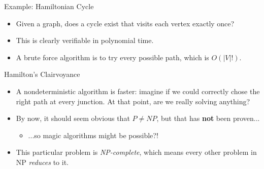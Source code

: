 \documentclass[aspectratio=169, handout]{beamer}
\begin{document}
\begin{frame}{Example: Hamiltonian Cycle}
    \begin{itemize}
        \item Given a graph, does a cycle exist that visits each vertex exactly once?
    \end{itemize}
    \begin{center}
    \end{center} \pause
    \begin{itemize}
        \item This is clearly verifiable in polynomial time. \pause
        \item A brute force algorithm is to try every possible path, which is $O(|V|!)$.
    \end{itemize}
\end{frame}


\begin{frame}{Hamilton's Clairvoyance}
    \begin{itemize}
        \item A nondeterministic algorithm is faster: imagine if we could correctly chose the right path at every junction. At that point, are we really solving anything? \pause
        \item By now, it should seem obvious that $P \ne NP$, but that has \textbf{not} been proven...
        \begin{itemize}
            \item ...so magic algorithms might be possible?! \pause
        \end{itemize}
        \item This particular problem is \emph{NP-complete}, which means every other problem in NP \emph{reduces} to it. 
    \end{itemize}
\end{frame}
\end{document}
